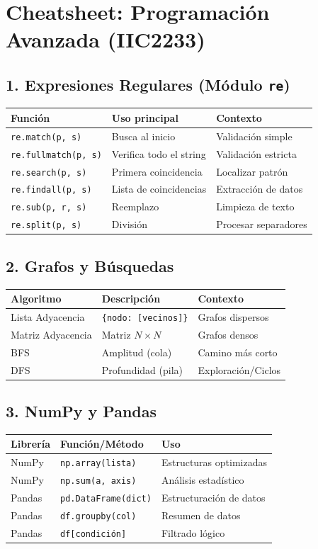 \documentclass{article}
\begin{document}
\section*{Cheatsheet: Programación Avanzada (IIC2233)}

\subsection*{1. Expresiones Regulares (Módulo \texttt{re})}
\begin{tabular}{lll}
\toprule
\textbf{Función} & \textbf{Uso principal} & \textbf{Contexto} \\
\midrule
\texttt{re.match(p, s)} & Busca al inicio & Validación simple \\
\texttt{re.fullmatch(p, s)} & Verifica todo el string & Validación estricta \\
\texttt{re.search(p, s)} & Primera coincidencia & Localizar patrón \\
\texttt{re.findall(p, s)} & Lista de coincidencias & Extracción de datos \\
\texttt{re.sub(p, r, s)} & Reemplazo & Limpieza de texto \\
\texttt{re.split(p, s)} & División & Procesar separadores \\
\bottomrule
\end{tabular}

\subsection*{2. Grafos y Búsquedas}
\begin{tabular}{lll}
\toprule
\textbf{Algoritmo} & \textbf{Descripción} & \textbf{Contexto} \\
\midrule
Lista Adyacencia & \texttt{\{nodo: [vecinos]\}} & Grafos dispersos \\
Matriz Adyacencia & Matriz $N \times N$ & Grafos densos \\
BFS & Amplitud (cola) & Camino más corto \\
DFS & Profundidad (pila) & Exploración/Ciclos \\
\bottomrule
\end{tabular}

\subsection*{3. NumPy y Pandas}
\begin{tabular}{lll}
\toprule
\textbf{Librería} & \textbf{Función/Método} & \textbf{Uso} \\
\midrule
NumPy & \texttt{np.array(lista)} & Estructuras optimizadas \\
NumPy & \texttt{np.sum(a, axis)} & Análisis estadístico \\
Pandas & \texttt{pd.DataFrame(dict)} & Estructuración de datos \\
Pandas & \texttt{df.groupby(col)} & Resumen de datos \\
Pandas & \texttt{df[condición]} & Filtrado lógico \\
\bottomrule
\end{tabular}
\end{document}
